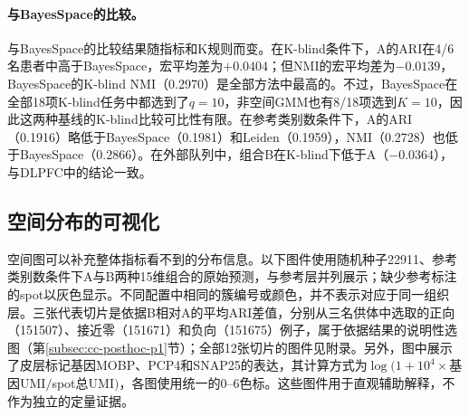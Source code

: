 \paragraph{与BayesSpace的比较。}与BayesSpace的比较结果随指标和K规则而变。在K-blind条件下，A的ARI在4/6名患者中高于BayesSpace，宏平均差为$+0.0404$；但NMI的宏平均差为$-0.0139$，BayesSpace的K-blind NMI（0.2970）是全部方法中最高的。不过，BayesSpace在全部18项K-blind任务中都选到了$q=10$，非空间GMM也有8/18项选到$K=10$，因此这两种基线的K-blind比较可比性有限。在参考类别数条件下，A的ARI（0.1916）略低于BayesSpace（0.1981）和Leiden（0.1959），NMI（0.2728）也低于BayesSpace（0.2866）。在外部队列中，组合B在K-blind下低于A（$-0.0364$），与DLPFC中的结论一致。

\subsection{空间分布的可视化}
\label{subsec:cc-res-maps-p1}
空间图可以补充整体指标看不到的分布信息。以下图件使用随机种子22911、参考类别数条件下A与B两种15维组合的原始预测，与参考层并列展示；缺少参考标注的spot以灰色显示。不同配置中相同的簇编号或颜色，并不表示对应于同一组织层。三张代表切片是依据B相对A的平均ARI差值，分别从三名供体中选取的正向（151507）、接近零（151671）和负向（151675）例子，属于依据结果的说明性选图（第\ref{subsec:cc-posthoc-p1}节）；全部12张切片的图件见附录。另外，图中展示了皮层标记基因MOBP、PCP4和SNAP25的表达，其计算方式为$\log(1+10^4\times$基因UMI$/$spot总UMI$)$，各图使用统一的0--6色标。这些图件用于直观辅助解释，不作为独立的定量证据。

